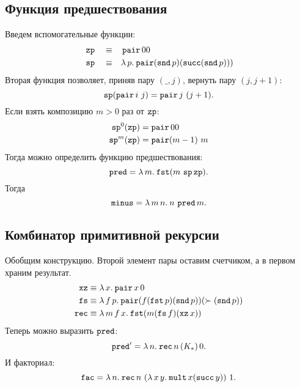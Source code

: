 \documentclass[11pt,a4paper]{article}
\begin{document}
\subsection{Функция предшествования}
Введем вспомогательные функции:
\[
\begin{aligned}
	& \zp && \equiv && \pair 0 0 \\
	& \fpsp && \equiv && \lam{p}{\pair (\snd p) (\fpsucc (\snd p)))}
\end{aligned}
\]
Вторая функция позволяет, приняв пару $ (\_, j)$, вернуть пару  $ (j, j+1)$:
 \[
	 \fpsp(\pair i~ j) = \pair j~ (j+1)
.\] 
Если взять композицию $ m > 0$ раз от $\zp$:
\[
\begin{aligned}
	\fpsp^{0} (\zp) & = \pair 0 0 \\
	\fpsp^{m}(\zp) &= \pair (m-1)~ m
\end{aligned}
\]
Тогда можно определить функцию предшествования:
\[
	\fppred = \lam{m}{\fst (m \, \fpsp \zp)}
.\] 
Тогда 
\[
	\fpminus = \lam{m\,n}{n\, \fppred m}
.\] 

\subsection{Комбинатор примитивной рекурсии}
Обобщим конструкцию. Второй элемент пары оставим счетчиком, а в первом храним результат.
\[
\begin{aligned}
	\fpxz & \equiv \lam{x}{\pair x \, 0} \\
	\fpfs & \equiv \lam {f \, p}{\pair (f (\fst p) (\snd p)) (\succ (\snd p))} \\
	\fprec & \equiv \lam{m\,f\,x}{\fst (m (\fpfs f) (\fpxz x))}
\end{aligned}
\]
Теперь можно выразить $ \fppred$:
 \[
	 \fppred' = \lam{n}{\fprec n\, (K_{*})\, 0}
.\] 
И факториал:
\[
	\fac = \lam{n}{\fprec n \, \left( \lam{x\,y}{\fpmult x (\fpsucc y)} \right) \, 1}
.\] 
\end{document}
